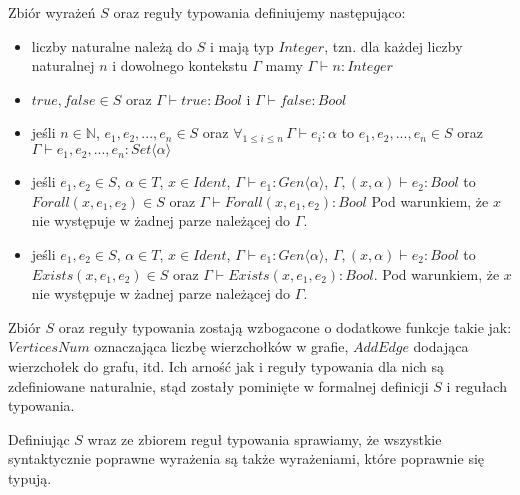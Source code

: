 \documentclass[thesis.tex]{subfiles}
\begin{document}
Zbiór wyrażeń $S$ oraz reguły typowania definiujemy następująco:
\begin{itemize}
    \item liczby naturalne należą do $S$ i mają typ $Integer$, tzn. dla każdej
        liczby naturalnej $n$ i dowolnego kontekstu $\Gamma$ mamy $\Gamma
        \vdash n : Integer$
    \item $true, false \in S$ oraz $\Gamma \vdash true : Bool$ i $\Gamma \vdash false : Bool$
    \item jeśli $n \in \mathbb{N}$, $e_1, e_2, ..., e_n \in S$ oraz
        $\forall_{1 \leq i \leq n} \, \Gamma \vdash e_i : \alpha$ to
        ${e_1, e_2, ..., e_n} \in S$ oraz
        $\Gamma \vdash {e_1, e_2, ..., e_n} : Set\langle \alpha \rangle$
    \item jeśli $e_1, e_2 \in S$,
        $\alpha \in T$,
        $x \in Ident$,
        $\Gamma \vdash e_1 : Gen\langle \alpha \rangle$,
        $\Gamma, (x, \alpha) \vdash e_2 : Bool$ to
        $Forall(x, e_1, e_2) \in S$ oraz $\Gamma \vdash Forall(x, e_1, e_2) : Bool$
        Pod warunkiem, że $x$ nie występuje w żadnej parze należącej do $\Gamma$.
    \item jeśli $e_1, e_2 \in S$,
        $\alpha \in T$,
        $x \in Ident$,
        $\Gamma \vdash e_1 : Gen\langle \alpha \rangle$,
        $\Gamma, (x, \alpha) \vdash e_2 : Bool$ to
        $Exists(x, e_1, e_2) \in S$ oraz $\Gamma \vdash Exists(x, e_1, e_2) : Bool$.
        Pod warunkiem, że $x$ nie występuje w żadnej parze należącej do $\Gamma$.
\end{itemize}


Zbiór $S$ oraz reguły typowania zostają wzbogacone o dodatkowe funkcje takie
jak: $VerticesNum$ oznaczająca liczbę wierzchołków w grafie, $AddEdge$ dodająca
wierzchołek do grafu, itd. Ich arność jak i reguły typowania dla nich są
zdefiniowane naturalnie, stąd zostały pominięte w formalnej definicji $S$ i regułach typowania.

Definiując $S$ wraz ze zbiorem reguł typowania sprawiamy, że wszystkie
syntaktycznie poprawne wyrażenia są także wyrażeniami, które poprawnie się
typują.
\end{document}
